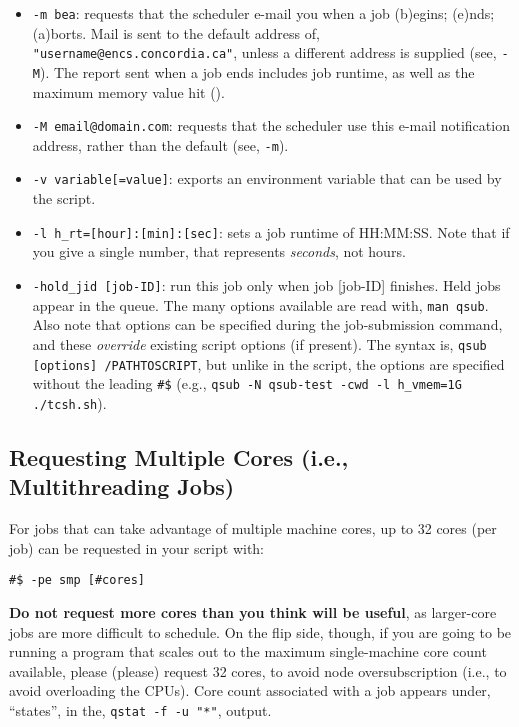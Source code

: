 \documentclass{easychair}
\begin{document}
\begin{itemize}
\item
\texttt{-m bea}: requests that the scheduler e-mail you when a job (b)egins; (e)nds; (a)borts. Mail is sent to the default address of, \texttt{"username@encs.concordia.ca"}, unless a different address is supplied (see, \texttt{-M}). The report sent when a job ends includes job 
runtime, as well as the maximum memory value hit (). 

\item
\texttt{-M email@domain.com}: requests that the scheduler use this e-mail notification address, rather than the default (see, \texttt{-m}). 

\item
\texttt{-v variable[=value]}: exports an environment variable that can be used by the script.

\item
\texttt{-l h\_rt=[hour]:[min]:[sec]}: sets a job runtime of HH:MM:SS. Note that if you give a single number, that represents \emph{seconds}, not hours. 

\item
\texttt{-hold\_jid [job-ID]}: run this job only when job [job-ID] finishes. Held jobs appear in the queue. 
The many  options available are read with, \texttt{man qsub}. Also note that  options can be specified during the job-submission command, and these \emph{override} existing script options (if present). The syntax is, \texttt{qsub [options] /PATHTOSCRIPT}, but unlike in the script, the options are specified without the leading \verb+#$+ (e.g., \texttt{qsub -N qsub-test -cwd -l h\_vmem=1G ./tcsh.sh}). 
\end{itemize}

\subsection{Requesting Multiple Cores (i.e., Multithreading Jobs)}

For jobs that can take advantage of multiple machine cores, up to 32 cores (per job) can be requested in your script with: 

\begin{verbatim}
#$ -pe smp [#cores] 
\end{verbatim}

\textbf{Do not request more cores than you think will be useful}, as larger-core jobs are more difficult to schedule. On the flip side, though, if you are going to be running a program that scales out to the maximum single-machine core count available, please (please) request 32 cores, to avoid node oversubscription (i.e., to avoid overloading the CPUs).
Core count associated with a job appears under, ``states'', in the, \texttt{qstat -f -u "*"}, output.
\end{document}
